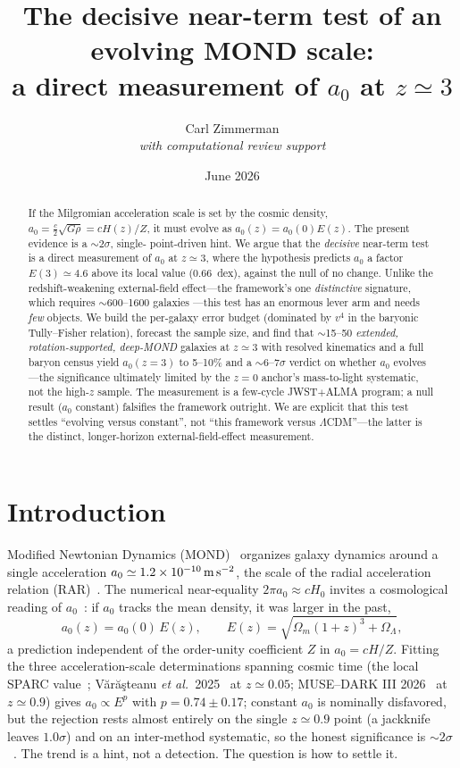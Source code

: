 \documentclass[11pt]{article}
\title{\bf The decisive near-term test of an evolving MOND scale:\\
a direct measurement of $a_0$ at $z\simeq3$}
\author{Carl Zimmerman\\[2pt]\small\it with computational review support}
\date{June 2026}
\newcommand{\az}{a_0}
\newcommand{\Ez}{E(z)}
\begin{document}
\maketitle

\begin{abstract}
\noindent
If the Milgromian acceleration scale is set by the cosmic density, $\az=\tfrac{c}{2}\sqrt{G\rho}=
cH(z)/Z$, it must evolve as $\az(z)=\az(0)\Ez$. The present evidence is a $\sim2\sigma$, single-
point-driven hint. We argue that the \emph{decisive} near-term test is a direct measurement of
$\az$ at $z\simeq3$, where the hypothesis predicts $\az$ a factor $E(3)\simeq4.6$ above its local
value (0.66~dex), against the null of no change. Unlike the redshift-weakening external-field
effect---the framework's one \emph{distinctive} signature, which requires $\sim$600--1600 galaxies
---this test has an enormous lever arm and needs \emph{few} objects. We build the per-galaxy error
budget (dominated by $v^4$ in the baryonic Tully--Fisher relation), forecast the sample size, and
find that $\sim$15--50 \emph{extended, rotation-supported, deep-MOND} galaxies at $z\simeq3$ with
resolved kinematics and a full baryon census yield $\az(z{=}3)$ to 5--10\% and a $\sim6$--$7\sigma$
verdict on whether $\az$ evolves---the significance ultimately limited by the $z=0$ anchor's
mass-to-light systematic, not the high-$z$ sample. The measurement is a few-cycle JWST$+$ALMA
program; a null result ($\az$ constant) falsifies the framework outright. We are explicit that this
test settles ``evolving versus constant'', not ``this framework versus $\Lambda$CDM''---the latter
is the distinct, longer-horizon external-field-effect measurement.
\end{abstract}

\section{Introduction}
Modified Newtonian Dynamics (MOND)~\cite{Milgrom1983,Famaey2012} organizes galaxy dynamics around a
single acceleration $\az\simeq1.2\times10^{-10}\,{\rm m\,s^{-2}}$, the scale of the radial
acceleration relation (RAR)~\cite{McGaugh2016,Lelli2017}. The numerical near-equality $2\pi\az
\approx cH_0$ invites a cosmological reading of $\az$~\cite{Milgrom2014}: if $\az$ tracks the mean
density, it was larger in the past,
\begin{equation}
\az(z)=\az(0)\,\Ez,\qquad \Ez=\sqrt{\Omega_m(1+z)^3+\Omega_\Lambda},
\label{eq:Ez}
\end{equation}
a prediction independent of the order-unity coefficient $Z$ in $\az=cH/Z$. Fitting the three
acceleration-scale determinations spanning cosmic time (the local SPARC value~\cite{McGaugh2016};
V\u{a}r\u{a}\c{s}teanu \textit{et al.}~2025~\cite{Varasteanu2025} at $z\simeq0.05$; MUSE--DARK III
2026~\cite{MUSEDARK2026} at $z\simeq0.9$) gives $\az\propto E^p$ with $p=0.74\pm0.17$; constant
$\az$ is nominally disfavored, but the rejection rests almost entirely on the single $z\simeq0.9$
point (a jackknife leaves $1.0\sigma$) and on an inter-method systematic, so the honest
significance is $\sim2\sigma$~\cite{repo}. The trend is a hint, not a detection. The question is how
to settle it.
\end{document}
